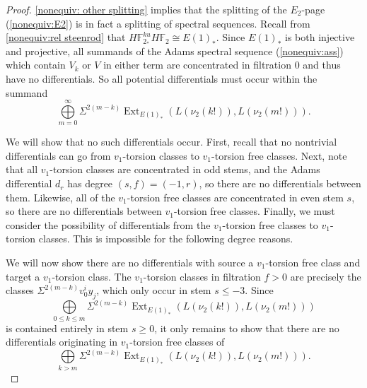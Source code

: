 \documentclass{amsart}
\theoremstyle{plain}
\numberwithin{equation}{section}
\numberwithin{figure}{section}
\DeclareMathOperator{\Ext}{Ext}
\newcommand{\mF}{{\mathbb F}}
\newcommand{\0}{\langle 0 \rangle }
\begin{document}
\begin{proof}
\cref{nonequiv: other splitting} implies that the splitting of the $E_{2}$-page (\ref{nonequiv:E2}) is in fact a splitting of spectral sequences. Recall from \cref{nonequiv:rel steenrod} that $H\mF_{2_{*}}^{ku}H\mF_{2} \cong E(1)_{*}$. Since $E(1)_{*}$ is both injective and projective, all summands of the Adams spectral sequence (\ref{nonequiv:ass}) which contain $V_k$ or $V$ in either term are concentrated in filtration $0$ and thus have no differentials. So all potential differentials must occur within the summand
\[
\bigoplus\limits_{m=0}^{\infty} \Sigma^{2(m-k)} \Ext_{E(1)_{*}}\left(L(\nu_{2}(k!)), L(\nu_{2}(m!)) \right).
\]

We will show that no such differentials occur. First, recall that no nontrivial differentials can go from $v_{1}$-torsion classes to $v_{1}$-torsion free classes. Next, note that all $v_{1}$-torsion classes are concentrated in odd stems, and the Adams differential $d_{r}$ has degree $(s,f) = (-1,r)$, so there are no differentials between them. Likewise, all of the $v_{1}$-torsion free classes are concentrated in even stem $s$, so there are no differentials between $v_{1}$-torsion free classes.  Finally, we must consider the possibility of differentials from the $v_{1}$-torsion free classes to $v_{1}$-torsion classes. This is impossible for the following degree reasons. 

 We will now show there are no differentials with source a $v_1$-torsion free class and target a $v_{1}$-torsion class. The $v_1$-torsion classes in filtration $f > 0$ are precisely the classes $\Sigma^{2(m-k)}v_0^iy_{j}$, which only occur in stem $s \le -3$. Since 
\[
\bigoplus\limits_{0 \le k \le m}\Sigma^{2(m-k)}\Ext_{E(1)_*}( L(\nu_{2}(k!) ), L(\nu_{2}(m!) ) )
\]
is contained entirely in stem $s \ge 0$, it only remains to show that there are no differentials originating in $v_1$-torsion free classes of
\[
\bigoplus\limits_{k > m}\Sigma^{2(m-k)}\Ext_{E(1)_*}( L(\nu_{2}(k!) ), L(\nu_{2}(m!) ) )
.\]




\end{proof}
\end{document}
